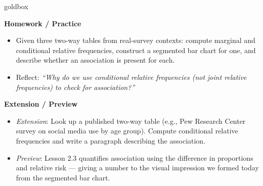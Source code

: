 \documentclass[10pt]{article}
\begin{document}
\begin{skillbox}{goldbox}
\begin{minipage}[t]{0.48\linewidth}
    \textbf{Homework / Practice}
    \begin{itemize}
        \item Given three two-way tables from real-survey contexts: compute marginal and
              conditional relative frequencies, construct a segmented bar chart for one,
              and describe whether an association is present for each.
        \item Reflect: \textit{``Why do we use conditional relative frequencies (not joint
              relative frequencies) to check for association?''}
    \end{itemize}
\end{minipage}
\hfill
\begin{minipage}[t]{0.48\linewidth}
    \textbf{Extension / Preview}
    \begin{itemize}
        \item \textit{Extension}: Look up a published two-way table (e.g., Pew Research
              Center survey on social media use by age group). Compute conditional relative
              frequencies and write a paragraph describing the association.
        \item \textit{Preview}: Lesson 2.3 quantifies association using the difference in
              proportions and relative risk --- giving a number to the visual impression we
              formed today from the segmented bar chart.
    \end{itemize}
\end{minipage}
\end{skillbox}
\end{document}

